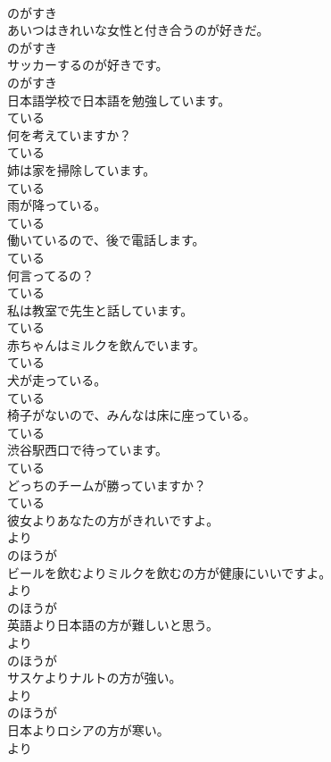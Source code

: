 \documentclass[8pt]{extreport}
\begin{document}
\begin{CJK}{UTF8}{min}
\\	のがすき
\\	あいつはきれいな女性と付き合うのが好きだ。	
\\	のがすき
\\	サッカーするのが好きです。	
\\	のがすき
\\	日本語学校で日本語を勉強しています。	
\\	ている
\\	何を考えていますか？	
\\	ている
\\	姉は家を掃除しています。	
\\	ている
\\	雨が降っている。	
\\	ている
\\	働いているので、後で電話します。	
\\	ている
\\	何言ってるの？	
\\	ている
\\	私は教室で先生と話しています。	
\\	ている
\\	赤ちゃんはミルクを飲んでいます。	
\\	ている
\\	犬が走っている。	
\\	ている
\\	椅子がないので、みんなは床に座っている。	
\\	ている
\\	渋谷駅西口で待っています。	
\\	ている
\\	どっちのチームが勝っていますか？	
\\	ている
\\	彼女よりあなたの方がきれいですよ。	
\\	より 
\\	のほうが 
\\	ビールを飲むよりミルクを飲むの方が健康にいいですよ。	
\\	より 
\\	のほうが 
\\	英語より日本語の方が難しいと思う。	
\\	より 
\\	のほうが 
\\	サスケよりナルトの方が強い。	
\\	より 
\\	のほうが 
\\	日本よりロシアの方が寒い。	
\\	より 

\end{CJK}
\end{document}
